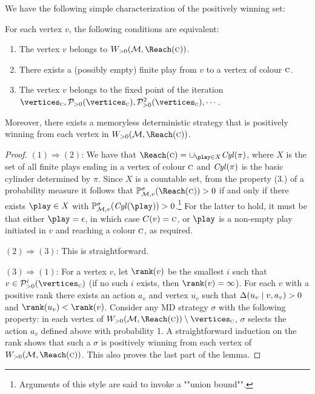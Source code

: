 We have the following simple characterization of the positively winning set:

\begin{theorem}
\label{5-thm:positive-char}
For each vertex $v$, the following conditions are equivalent:
\begin{enumerate}
\item The vertex $v$ belongs to $\winPos(\mdp,\Reach(\genColour))$.
\item There 
exists a (possibly empty) finite play from $v$ to a vertex of colour $\textsc{c}$.
\item The vertex $v$ 
belongs to the fixed point of the iteration $\vertices_\genColour, 
\PreOPPos(\vertices_\genColour),\PreOPPos^2(\vertices_\genColour),\cdots$.
\end{enumerate}
Moreover, there exists a memoryless deterministic strategy that is positively 
winning from each vertex in $\winPos(\mdp,\Reach(\genColour))$.
\end{theorem}
\begin{proof}
$(1)\Rightarrow(2)$: We have that $\Reach(\genColour) = \cup_{\play \in X} 
\cylinder(\pi)$, where $X$ is the set of all finite plays ending in a vertex of 
colour $\textsc{c}$ and $\mathit{Cyl}(\pi)$ is the basic cylinder determined by 
$\pi$. Since $X$ is a countable set, from the property (3.) of a probability 
measure it follows that $\probm^\sigma_{\mdp,v}(\Reach(\genColour))>0$ if and 
only if there exists $\play\in X$ with 
$\probm^\sigma_{\mdp,v}(\cylinder(\play))>0$.\footnote{Arguments of this style are said to invoke a ""union bound"". } For the latter to hold, it must 
be that either $\play=\emptyPlay$, in which case $C(v)=\textsc{c}$, or 
$\play$ is a non-empty play initiated in $v$ and reaching a colour 
$\textsc{c}$, as required.


$(2)\Rightarrow(3)$:
This is straightforward.
	
$(3)\Rightarrow (1)$:	
For a vertex $v$, let $\rank(v)$ be the smallest $i$ such that $v \in 
\PreOPPos^i(\vertices_\genColour)$ (if no such $i$ exists, then 
$\rank(v)=\infty$). For each $v$ with a positive rank there exists an action 
$a_v$ and vertex $u_v$ such that $\Delta(u_v\mid v,a_v)>0$ and 
$\rank(u_v)< \rank(v)$. Consider any MD strategy $  \sigma $ with the following property: 
in each vertex of 
$\winPos(\mdp,\Reach(\genColour))\setminus \vertices_{\genColour}$, $ \sigma $ selects the 
action $a_v$ defined above with probability 1. A straightforward induction on the rank shows that such a $ \sigma $ is positively winning from each vertex of 
$\winPos(\mdp,\Reach(\genColour))$. This also proves the last part 
of the lemma.
\end{proof}

